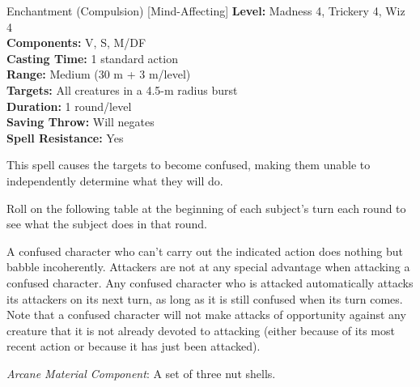 {Enchantment (Compulsion) [Mind-Affecting]}
{
	\textbf{Level:}
	Madness 4, Trickery 4, Wiz 4\\
	\textbf{Components:}
	V, S, M/DF\\
	\textbf{Casting Time:}
	1 standard action\\
	\textbf{Range:}
	Medium (30 m + 3 m/level)\\
	\textbf{Targets:}
	All creatures in a 4.5-m radius burst\\
	\textbf{Duration:}
	1 round/level\\
	\textbf{Saving Throw:}
	Will negates\\
	\textbf{Spell Resistance:}
	Yes\\
}
{
	This spell causes the targets to become confused, making them unable to independently determine what they will do.

	Roll on the following table at the beginning of each subject's turn each round to see what the subject does in that round.


	A confused character who can't carry out the indicated action does nothing but babble incoherently. Attackers are not at any special advantage when attacking a confused character. Any confused character who is attacked automatically attacks its attackers on its next turn, as long as it is still confused when its turn comes. Note that a confused character will not make attacks of opportunity against any creature that it is not already devoted to attacking (either because of its most recent action or because it has just been attacked).

	\textit{Arcane Material Component}:
	A set of three nut shells.

}
